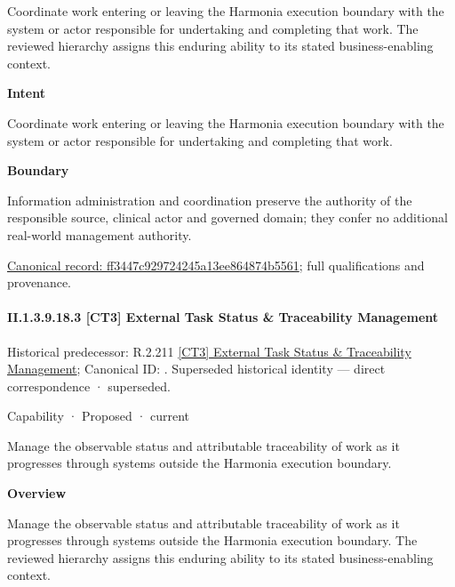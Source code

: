 Coordinate work entering or leaving the Harmonia execution boundary with the system or actor responsible for undertaking and completing that work. The reviewed hierarchy assigns this enduring ability to its stated business-enabling context.



\textbf{Intent}



Coordinate work entering or leaving the Harmonia execution boundary with the system or actor responsible for undertaking and completing that work.



\textbf{Boundary}



Information administration and coordination preserve the authority of the responsible source, clinical actor and governed domain; they confer no additional real-world management authority.


{\footnotesize \href{../../../../../../../continuum/strategy/capability/ff3447c929724245a13ee864874b5561.md}{Canonical record: ff3447c929724245a13ee864874b5561}; full qualifications and provenance.}\par
\paragraph*{II.1.3.9.18.3 [CT3] External Task Status \& Traceability Management}
\label{navigation:II.1.3.9.18.3}

{\small Historical predecessor: R.2.211 \hyperref[element:95985d244a234571892a9e9b4024f594]{[CT3] External Task Status \& Traceability Management}; Canonical ID: \texttt{}. Superseded historical identity — direct correspondence · superseded.}\par
\label{element:b25bb04a8aa94dcfac105a646878ccfc}
{\small Capability · Proposed · current}\par

Manage the observable status and attributable traceability of work as it progresses through systems outside the Harmonia execution boundary.



\textbf{Overview}



Manage the observable status and attributable traceability of work as it progresses through systems outside the Harmonia execution boundary. The reviewed hierarchy assigns this enduring ability to its stated business-enabling context.



